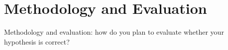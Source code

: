 \section{Methodology and Evaluation}
Methodology and evaluation: how do you plan to evaluate whether your
hypothesis is correct?